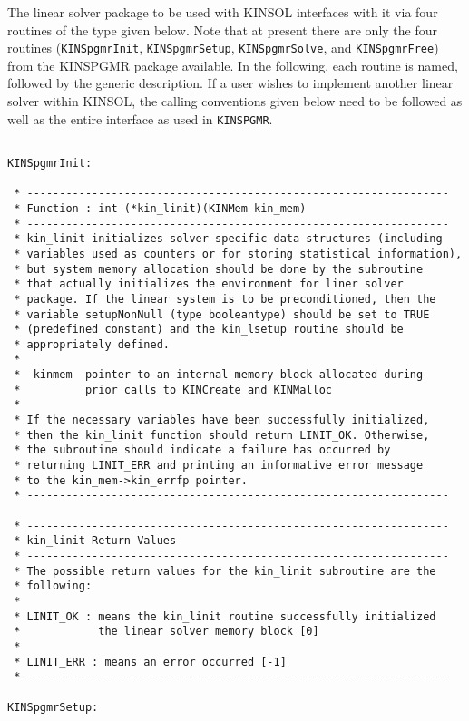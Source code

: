 \documentclass[11pt]{article}
\begin{document}
The linear solver package to be used with KINSOL interfaces with it 
via four routines of the type given below. Note that at present there
are only the four routines ({\tt KINSpgmrInit}, {\tt KINSpgmrSetup}, 
{\tt KINSpgmrSolve}, and {\tt KINSpgmrFree}) from the KINSPGMR package available.
In the following, each routine is named, followed by the generic description.
If a user wishes to implement another linear solver within KINSOL, the calling
conventions given below need to be followed as well as the entire interface
as used in {\tt KINSPGMR}.
\small
\begin{verbatim}

KINSpgmrInit:

 * -----------------------------------------------------------------
 * Function : int (*kin_linit)(KINMem kin_mem)
 * -----------------------------------------------------------------
 * kin_linit initializes solver-specific data structures (including
 * variables used as counters or for storing statistical information),
 * but system memory allocation should be done by the subroutine
 * that actually initializes the environment for liner solver
 * package. If the linear system is to be preconditioned, then the
 * variable setupNonNull (type booleantype) should be set to TRUE
 * (predefined constant) and the kin_lsetup routine should be
 * appropriately defined.
 *
 *  kinmem  pointer to an internal memory block allocated during
 *          prior calls to KINCreate and KINMalloc
 *
 * If the necessary variables have been successfully initialized,
 * then the kin_linit function should return LINIT_OK. Otherwise,
 * the subroutine should indicate a failure has occurred by
 * returning LINIT_ERR and printing an informative error message
 * to the kin_mem->kin_errfp pointer.
 * -----------------------------------------------------------------

 * -----------------------------------------------------------------
 * kin_linit Return Values
 * -----------------------------------------------------------------
 * The possible return values for the kin_linit subroutine are the
 * following:
 *
 * LINIT_OK : means the kin_linit routine successfully initialized
 *            the linear solver memory block [0]
 *
 * LINIT_ERR : means an error occurred [-1]
 * -----------------------------------------------------------------

KINSpgmrSetup:


\end{verbatim}
\end{document}

